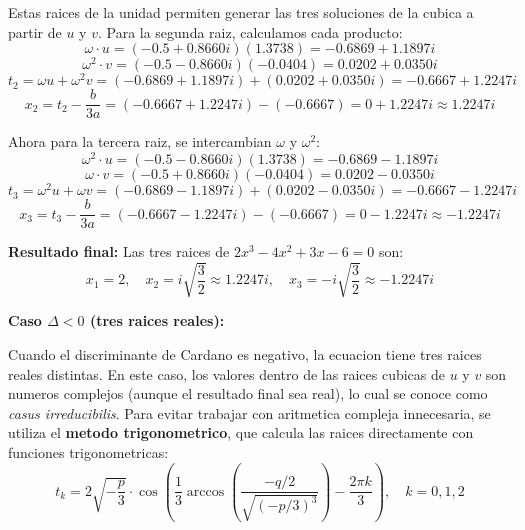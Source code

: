 \documentclass[letterpaper,12pt]{article}
\begin{document}
    Estas raices de la unidad permiten generar las tres soluciones de la cubica a partir de $u$ y $v$. Para la segunda raiz, calculamos cada producto:
    \begin{equation}
        \omega \cdot u = \left(-0.5 + 0.8660i\right)(1.3738) = -0.6869 + 1.1897i
    \end{equation}
    \begin{equation}
        \omega^2 \cdot v = \left(-0.5 - 0.8660i\right)(-0.0404) = 0.0202 + 0.0350i
    \end{equation}
    \begin{equation}
        t_2 = \omega u + \omega^2 v = (-0.6869 + 1.1897i) + (0.0202 + 0.0350i) = -0.6667 + 1.2247i
    \end{equation}
    \begin{equation}
        x_2 = t_2 - \frac{b}{3a} = (-0.6667 + 1.2247i) - (-0.6667) = 0 + 1.2247i \approx 1.2247i
    \end{equation}

    Ahora para la tercera raiz, se intercambian $\omega$ y $\omega^2$:
    \begin{equation}
        \omega^2 \cdot u = \left(-0.5 - 0.8660i\right)(1.3738) = -0.6869 - 1.1897i
    \end{equation}
    \begin{equation}
        \omega \cdot v = \left(-0.5 + 0.8660i\right)(-0.0404) = 0.0202 - 0.0350i
    \end{equation}
    \begin{equation}
        t_3 = \omega^2 u + \omega v = (-0.6869 - 1.1897i) + (0.0202 - 0.0350i) = -0.6667 - 1.2247i
    \end{equation}
    \begin{equation}
        x_3 = t_3 - \frac{b}{3a} = (-0.6667 - 1.2247i) - (-0.6667) = 0 - 1.2247i \approx -1.2247i
    \end{equation}

    \textbf{Resultado final:} Las tres raices de $2x^3 - 4x^2 + 3x - 6 = 0$ son:
    \begin{equation}
        x_1 = 2, \quad x_2 = i\sqrt{\frac{3}{2}} \approx 1.2247i, \quad x_3 = -i\sqrt{\frac{3}{2}} \approx -1.2247i
    \end{equation}

    \textbf{Caso $\Delta < 0$ (tres raices reales):}

    Cuando el discriminante de Cardano es negativo, la ecuacion tiene tres raices reales distintas. En este caso, los valores dentro de las raices cubicas de $u$ y $v$ son numeros complejos (aunque el resultado final sea real), lo cual se conoce como \textit{casus irreducibilis}. Para evitar trabajar con aritmetica compleja innecesaria, se utiliza el \textbf{metodo trigonometrico}, que calcula las raices directamente con funciones trigonometricas:
    \begin{equation}
        t_k = 2\sqrt{-\frac{p}{3}} \cdot \cos\left(\frac{1}{3}\arccos\left(\frac{-q/2}{\sqrt{(-p/3)^3}}\right) - \frac{2\pi k}{3}\right), \quad k = 0, 1, 2
    \end{equation}
\end{document}
